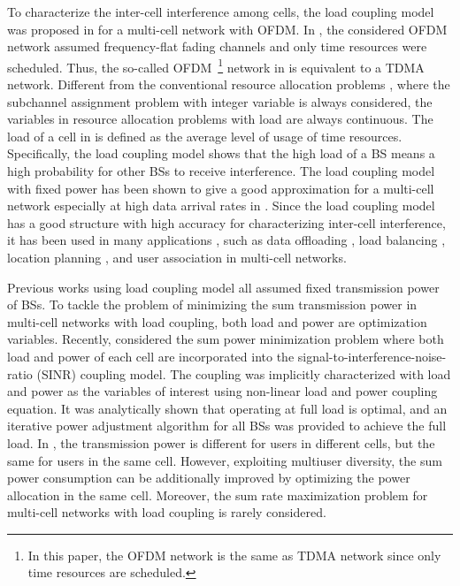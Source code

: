 \documentclass[journal]{IEEEtran}
\begin{document}
To characterize the inter-cell interference among cells, the load coupling model was proposed in \cite{Siomin2012Analysis} for a multi-cell network with OFDM.
In \cite{Siomin2012Analysis}, the considered OFDM network assumed frequency-flat fading channels and only time resources were scheduled.
Thus, the so-called OFDM~\footnote{In this paper, the OFDM network is the same as TDMA network since only time resources are scheduled.} network in \cite{Siomin2012Analysis} is equivalent to a TDMA network.
Different from the conventional resource allocation problems \cite{4027580,6294504,4278409,5773453,4489657,4698488}, where the subchannel assignment problem with integer variable is always considered, the variables in resource allocation problems \cite{fehske2012aggregation,siomina2014constrained,ho2014data,siomina2012load,siomina2013optimization,DBLPYouY16} with load are always continuous.
The load of a cell in \cite{Siomin2012Analysis} is defined as the average level of usage of time resources.
Specifically, the load coupling model shows that the high load of a BS means a high probability for other BSs to receive interference.
The load coupling model with fixed power has been shown to give a good approximation for a multi-cell network especially at high data arrival rates in \cite{fehske2012aggregation}.
Since the load coupling model has a good structure with high accuracy for characterizing inter-cell interference, it has been used in many applications \cite{siomina2014constrained}, such as data offloading \cite{ho2014data}, load balancing \cite{siomina2012load}, location planning \cite{siomina2013optimization}, and user association \cite{DBLPYouY16} in multi-cell networks.

Previous works \cite{Siomin2012Analysis,fehske2012aggregation,siomina2014constrained,ho2014data,siomina2012load,siomina2013optimization,DBLPYouY16} using load coupling model all assumed fixed transmission power of BSs.
To tackle the problem of minimizing the sum transmission power in multi-cell networks with load coupling, both load and power are optimization variables. %
Recently, \cite{Chin2015Power} considered the sum power minimization problem where both load and power of each cell are incorporated into the signal-to-interference-noise-ratio (SINR) coupling model.
The coupling was implicitly characterized with load and power as the variables of interest using non-linear load and power coupling equation.
It was analytically shown that operating at full load is optimal, and an iterative power adjustment algorithm for all BSs was provided to achieve the full load.
In \cite{Chin2015Power}, the transmission power is different for users in different cells, but the same for users in the same cell.
However, exploiting multiuser diversity, the sum power consumption can be additionally improved by optimizing the power allocation in the same cell.
Moreover, the sum rate maximization problem for multi-cell networks with load coupling is rarely considered.
\end{document}
